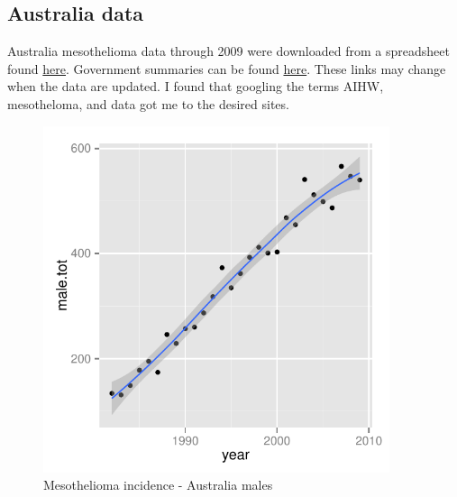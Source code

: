 \documentclass{article}\usepackage{graphicx, color}
\newenvironment{knitrout}{}{} %
\begin{document}
\subsection{Australia data}


Australia mesothelioma data through 2009 were downloaded from a spreadsheet found \href{http://www.google.com/url?sa=t&rct=j&q=&esrc=s&source=web&cd=2&ved=0CFkQFjAB&url=http%3A%2F%2Fwww.aihw.gov.au%2FWorkArea%2FDownloadAsset.aspx%3Fid%3D60129542445&ei=_gEgUujUAZK7sQS664CoAw&usg=AFQjCNHK5mdE14OBYiRGn2mKJ99QdE5JYw&sig2=TLAj4Y0hCvBI8wTttkKUqg&bvm=bv.51495398,d.cWc}{here}.  Government summaries can be found \href{http://www.google.com/url?sa=t&rct=j&q=&esrc=s&source=web&cd=3&ved=0CF4QFjAC&url=http%3A%2F%2Fwww.safeworkaustralia.gov.au%2Fsites%2FSWA%2Fabout%2FPublications%2FDocuments%2F602%2FMESOTHELIOMA%2520IN%2520AUSTRALIA.doc&ei=ZFMjUsSvD-u3sQTbpoGYAQ&usg=AFQjCNE8hcc3odmiMYv0DkJASn3YuihkmA&sig2=LSGsne4YvK1NCYdQa7HKnA&bvm=bv.51495398,d.cWc}{here}.  These links may change when the data are updated.  I found that googling the terms AIHW, mesotheloma, and data got me to the desired sites.

\begin{figure}[ht]
\vspace{.3in}
\centering
\begin{knitrout}
\color{fgcolor}
\includegraphics[width=4in,height=4in]{figure/Chunk-aussie-males} 

\end{knitrout}

\caption{ Mesothelioma incidence - Australia males}

\vspace{.3in}
\end{figure}
\end{document}
